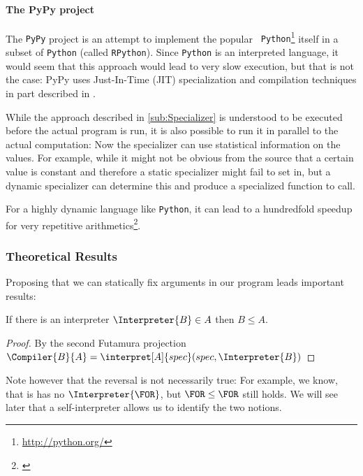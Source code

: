 \paragraph{The PyPy project} %
\label{par:ThePyPyproject}
\begin{example}
	The {\tt PyPy} project is an attempt to implement the popular {\tt
	Python}\footnote{\url{http://python.org/}} itself in a subset of {\tt Python}
	(called {\tt RPython}). Since {\tt Python} is an interpreted language, it
	would seem that this approach would lead to very slow execution, but that is
	not the case: PyPy uses Just-In-Time (JIT) specialization and compilation
	techniques in part described in \cite{psycho}.

	While the approach described in \ref{sub:Specializer} is understood to be 
	executed before the actual program is run, it is also possible to run it 
	in parallel to the actual computation: Now the specializer can use 
	statistical information on the values. For example, while it might not be 
	obvious from the source that a certain value is constant and therefore a 
	static specializer might fail to set in, but a dynamic specializer can 
	determine this and produce a specialized function to call.

	For a highly dynamic language like {\tt Python}, it can lead to a hundredfold 
	speedup for very repetitive arithmetics\footnote{\cite{psycho}}.
\end{example}


\subsubsection{Theoretical Results}
\label{ssub:spec theo}
Proposing that we can statically fix arguments in our program leads important results:
\begin{theorem}
	\label{thm:power-interpreter}
	If there is an interpreter $\Interpreter{B}\in A$ then $B\leq A$.
\end{theorem}
\begin{proof}
	By the second Futamura projection 
	$\Compiler{B}{A} = \interpret[A]{spec}(spec, \Interpreter{B})$
\end{proof}

Note however that the reversal is not necessarily true: For example, we know, that 
\FOR is has no $\Interpreter{\FOR}$, but $\FOR \leq \FOR$ still holds. We 
will see later that a self-interpreter allows us to identify the two notions.
